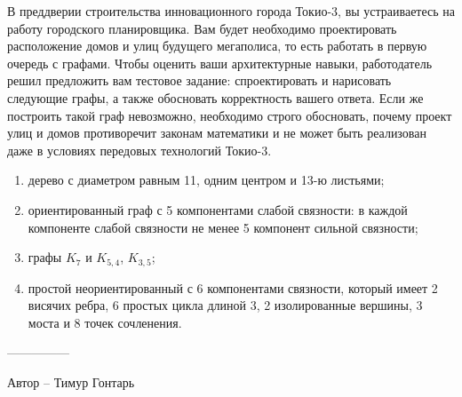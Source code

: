 \question
В преддверии строительства инновационного города Токио-3, вы устраиваетесь на работу городского планировщика. Вам будет необходимо проектировать расположение домов и улиц будущего мегаполиса, то есть работать в первую очередь с графами. Чтобы оценить ваши архитектурные навыки, работодатель решил предложить вам тестовое задание: спроектировать и нарисовать следующие графы, а также обосновать корректность вашего ответа. Если же построить такой граф невозможно, необходимо строго обосновать, почему проект улиц и домов противоречит законам математики и не может быть реализован даже в условиях передовых технологий Токио-3.

\begin{enumerate}
\item  дерево с диаметром равным 11, одним центром  и  13-ю листьями;
\item  ориентированный граф с 5 компонентами слабой связности: в  каждой компоненте слабой связности не менее 5 компонент сильной связности;
\item  графы $K_7$ и $K_{5,4}$, $K_{3,5}$;
\item  простой неориентированный с 6 компонентами связности, который имеет 2 висячих ребра, 6 простых цикла длиной 3, 2 изолированные вершины, 3 моста и 8 точек сочленения.
\end{enumerate}

---------------

Автор -- Тимур Гонтарь
